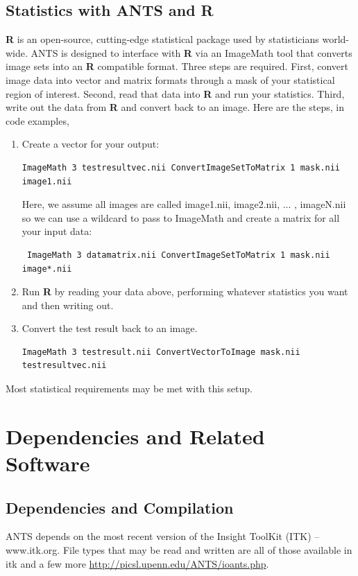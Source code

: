 \documentclass{InsightArticle}
\begin{document}
\subsection{Statistics with ANTS and {\bf R}}
{\bf R} is an open-source, cutting-edge statistical package 
used by statisticians world-wide.   ANTS is designed to 
interface with {\bf R} via an ImageMath tool that converts 
image sets into an {\bf R} compatible format.  
Three steps are required.  First, convert image data into 
vector and matrix formats through a mask of your statistical 
region of interest.  Second, read that data into {\bf R} and 
run your statistics.  Third, write out the data from {\bf R} and 
convert back to an image.  Here are the steps, in code examples,
\begin{enumerate}
\item Create a vector for your output: 
\begin{verbatim} 
ImageMath 3 testresultvec.nii ConvertImageSetToMatrix 1 mask.nii image1.nii
\end{verbatim}
Here, we assume all images are called image1.nii, image2.nii, ... , imageN.nii so we 
can use a wildcard to pass to ImageMath and 
create a matrix for all your input data: 
\begin{verbatim} 
 ImageMath 3 datamatrix.nii ConvertImageSetToMatrix 1 mask.nii image*.nii 
\end{verbatim}
\item   Run {\bf R} by reading your data above, performing whatever statistics you want and then 
writing out.  
\item   Convert the test result back to an image.  
\begin{verbatim} 
ImageMath 3 testresult.nii ConvertVectorToImage mask.nii testresultvec.nii
\end{verbatim}
\end{enumerate}
Most statistical requirements may be met with this setup. 
\newpage
\section{Dependencies and Related Software}
\subsection{Dependencies and Compilation}
ANTS depends on the most recent version of the Insight ToolKit (ITK)
-- www.itk.org.   File types that may be read and written are 
all of those available in itk and a few more \href{http://picsl.upenn.edu/ANTS/ioants.php}{http://picsl.upenn.edu/ANTS/ioants.php}.
\end{document}
